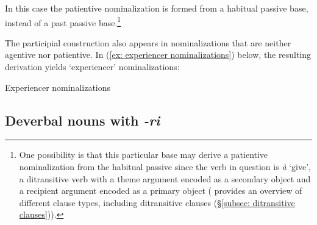 \newpage
In this case the patientive nominalization is formed from a habitual passive base, instead of a past passive base.\footnote{One possibility is that this particular base may derive a patientive nominalization from the habitual passive since the verb in question is \textit{à} ‘give’, a ditransitive verb with a theme argument encoded as a secondary object and a recipient argument encoded as a primary object ( provides an overview of different clause types, including ditransitive clauses (§\ref{subsec: ditransitive clauses})).}


The participial construction also appears in nominalizations that are neither agentive nor patientive. In (\ref{ex: experiencer nominalizations}) below, the resulting derivation yields ‘experiencer’ nominalizations:

\ea\label{ex: experiencer nominalizations}
{Experiencer nominalizations}

    \z
\z

\subsection{Deverbal nouns with \textit{-ri}}
\label{subsec: deverbal nouns with -ri}


